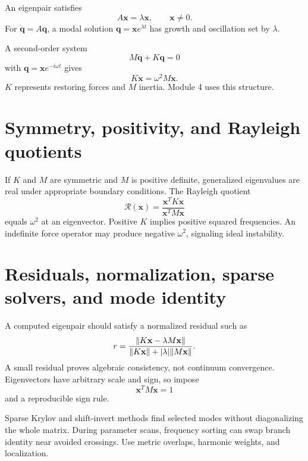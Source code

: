 \documentclass[11pt]{article}
\begin{document}
An eigenpair satisfies
\begin{equation}
A\mathbf x=\lambda\mathbf x,\qquad\mathbf x\ne0.
\end{equation}
For $\dot{\mathbf q}=A\mathbf q$, a modal solution $\mathbf q=\mathbf xe^{\lambda t}$ has growth and oscillation set by $\lambda$.

A second-order system
\begin{equation}
M\ddot{\mathbf q}+K\mathbf q=0
\end{equation}
with $\mathbf q=\mathbf xe^{-i\omega t}$ gives
\begin{equation}
K\mathbf x=\omega^2M\mathbf x.
\end{equation}
$K$ represents restoring forces and $M$ inertia. Module 4 uses this structure.


\section{Symmetry, positivity, and Rayleigh quotients}

If $K$ and $M$ are symmetric and $M$ is positive definite, generalized eigenvalues are real under appropriate boundary conditions. The Rayleigh quotient
\begin{equation}
\mathcal R(\mathbf x)=\frac{\mathbf x^TK\mathbf x}{\mathbf x^TM\mathbf x}
\end{equation}
equals $\omega^2$ at an eigenvector. Positive $K$ implies positive squared frequencies. An indefinite force operator may produce negative $\omega^2$, signaling ideal instability.


\section{Residuals, normalization, sparse solvers, and mode identity}

A computed eigenpair should satisfy a normalized residual such as
\begin{equation}
r=\frac{\norm{K\mathbf x-\lambda M\mathbf x}}
{\norm{K\mathbf x}+|\lambda|\norm{M\mathbf x}}.
\end{equation}
A small residual proves algebraic consistency, not continuum convergence. Eigenvectors have arbitrary scale and sign, so impose
\begin{equation}
\mathbf x^TM\mathbf x=1
\end{equation}
and a reproducible sign rule.

Sparse Krylov and shift-invert methods find selected modes without diagonalizing the whole matrix. During parameter scans, frequency sorting can swap branch identity near avoided crossings. Use metric overlaps, harmonic weights, and localization.
\end{document}
